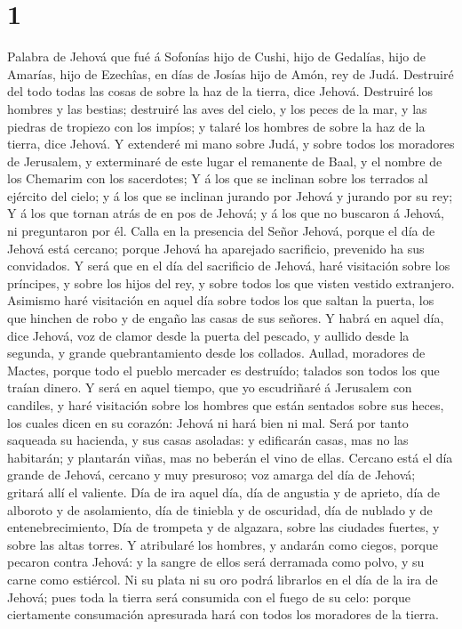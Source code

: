 \hypertarget{section}{%
\section{1}\label{section}}

 Palabra de Jehová que fué á Sofonías hijo de Cushi, hijo
de Gedalías, hijo de Amarías, hijo de Ezechîas, en días de Josías hijo
de Amón, rey de Judá.  Destruiré del todo todas las cosas
de sobre la haz de la tierra, dice Jehová.  Destruiré los
hombres y las bestias; destruiré las aves del cielo, y los peces de la
mar, y las piedras de tropiezo con los impíos; y talaré los hombres de
sobre la haz de la tierra, dice Jehová.  Y extenderé mi
mano sobre Judá, y sobre todos los moradores de Jerusalem, y exterminaré
de este lugar el remanente de Baal, y el nombre de los Chemarim con los
sacerdotes;  Y á los que se inclinan sobre los terrados al
ejército del cielo; y á los que se inclinan jurando por Jehová y jurando
por su rey;  Y á los que tornan atrás de en pos de Jehová;
y á los que no buscaron á Jehová, ni preguntaron por él. 
Calla en la presencia del Señor Jehová, porque el día de Jehová está
cercano; porque Jehová ha aparejado sacrificio, prevenido ha sus
convidados.  Y será que en el día del sacrificio de
Jehová, haré visitación sobre los príncipes, y sobre los hijos del rey,
y sobre todos los que visten vestido extranjero.  Asimismo
haré visitación en aquel día sobre todos los que saltan la puerta, los
que hinchen de robo y de engaño las casas de sus señores.
 Y habrá en aquel día, dice Jehová, voz de clamor desde
la puerta del pescado, y aullido desde la segunda, y grande
quebrantamiento desde los collados.  Aullad, moradores de
Mactes, porque todo el pueblo mercader es destruído; talados son todos
los que traían dinero.  Y será en aquel tiempo, que yo
escudriñaré á Jerusalem con candiles, y haré visitación sobre los
hombres que están sentados sobre sus heces, los cuales dicen en su
corazón: Jehová ni hará bien ni mal.  Será por tanto
saqueada su hacienda, y sus casas asoladas: y edificarán casas, mas no
las habitarán; y plantarán viñas, mas no beberán el vino de ellas.
 Cercano está el día grande de Jehová, cercano y muy
presuroso; voz amarga del día de Jehová; gritará allí el valiente.
 Día de ira aquel día, día de angustia y de aprieto, día
de alboroto y de asolamiento, día de tiniebla y de oscuridad, día de
nublado y de entenebrecimiento,  Día de trompeta y de
algazara, sobre las ciudades fuertes, y sobre las altas torres.
 Y atribularé los hombres, y andarán como ciegos, porque
pecaron contra Jehová: y la sangre de ellos será derramada como polvo, y
su carne como estiércol.  Ni su plata ni su oro podrá
librarlos en el día de la ira de Jehová; pues toda la tierra será
consumida con el fuego de su celo: porque ciertamente consumación
apresurada hará con todos los moradores de la tierra.

